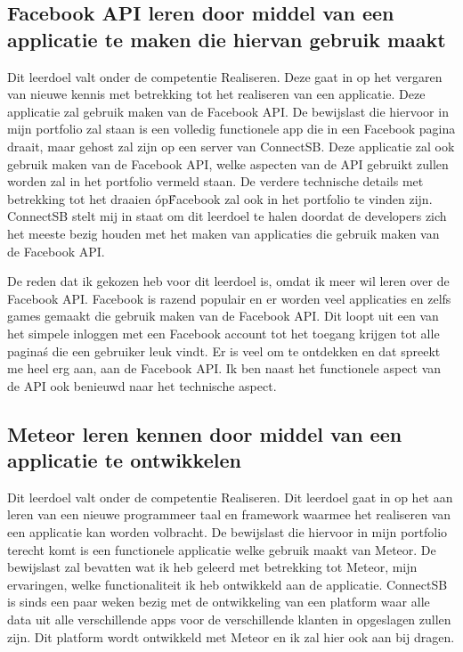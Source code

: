 \documentclass{article}
\begin{document}
\subsection{Facebook API leren door middel van een applicatie te maken die hiervan gebruik maakt}
Dit leerdoel valt onder de competentie Realiseren. Deze gaat in op het vergaren van nieuwe kennis met betrekking tot het realiseren van een applicatie. Deze applicatie zal gebruik maken van de Facebook API. De bewijslast die hiervoor in mijn portfolio zal staan is een volledig functionele app die in een Facebook pagina draait, maar gehost zal zijn op een server van ConnectSB. Deze applicatie zal ook gebruik maken van de Facebook API, welke aspecten van de API gebruikt zullen worden zal in het portfolio vermeld staan. De verdere technische details met betrekking tot het draaien \'op\' Facebook zal ook in het portfolio te vinden zijn. ConnectSB stelt mij in staat om dit leerdoel te halen doordat de developers zich het meeste bezig houden met het maken van applicaties die gebruik maken van de Facebook API.

De reden dat ik gekozen heb voor dit leerdoel is, omdat ik meer wil leren over de Facebook API. Facebook is razend populair en er worden veel applicaties en zelfs games gemaakt die gebruik maken van de Facebook API. Dit loopt uit een van het simpele inloggen met een Facebook account tot het toegang krijgen tot alle pagina\'s die een gebruiker leuk vindt. Er is veel om te ontdekken en dat spreekt me heel erg aan, aan de Facebook API. Ik ben naast het functionele aspect van de API ook benieuwd naar het technische aspect.

\subsection{Meteor leren kennen door middel van een applicatie te ontwikkelen}
Dit leerdoel valt onder de competentie Realiseren. Dit leerdoel gaat in op het aan leren van een nieuwe programmeer taal en framework waarmee het realiseren van een applicatie kan worden volbracht. De bewijslast die hiervoor in mijn portfolio terecht komt is een functionele applicatie welke gebruik maakt van Meteor. De bewijslast zal bevatten wat ik heb geleerd met betrekking tot Meteor, mijn ervaringen, welke functionaliteit ik heb ontwikkeld aan de applicatie. ConnectSB is sinds een paar weken bezig met de ontwikkeling van een platform waar alle data uit alle verschillende apps voor de verschillende klanten in opgeslagen zullen zijn. Dit platform wordt ontwikkeld met Meteor en ik zal hier ook aan bij dragen.
\end{document}
